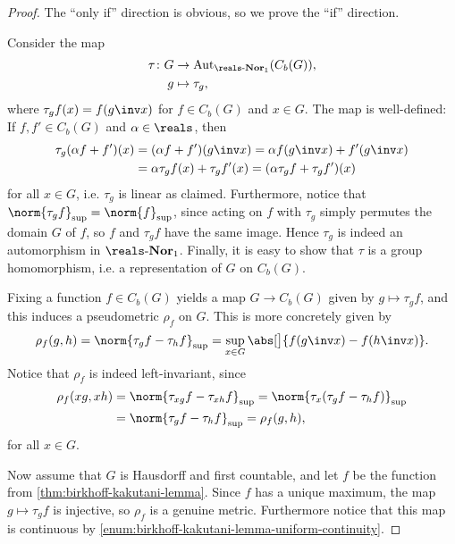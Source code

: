 \documentclass[article, a4paper, 11pt, oneside]{memoir}
\numberwithin{equation}{chapter}
\begin{document}
\begin{proof}
    The \enquote{only if} direction is obvious, so we prove the \enquote{if} direction.

    Consider the map
    \begin{align*}
        \tau \colon G &\to \mathrm{Aut}_{\catNor{\reals}_1}(C_b(G)), \\
        g &\mapsto \tau_g,
    \end{align*}
    where $\tau_g f(x) = f(g\inv x)$ for $f \in C_b(G)$ and $x \in G$. The map is well-defined: If $f,f' \in C_b(G)$ and $\alpha \in \reals$, then
    \begin{align*}
        \tau_g(\alpha f + f')(x)
            &= (\alpha f + f')(g\inv x)
             = \alpha f(g\inv x) + f'(g\inv x) \\
            &= \alpha \tau_g f(x) + \tau_g f'(x)
             = (\alpha \tau_g f + \tau_g f')(x)
    \end{align*}
    for all $x \in G$, i.e. $\tau_g$ is linear as claimed. Furthermore, notice that $\norm{\tau_g f}_{\sup} = \norm{f}_{\sup}$, since acting on $f$ with $\tau_g$ simply permutes the domain $G$ of $f$, so $f$ and $\tau_g f$ have the same image. Hence $\tau_g$ is indeed an automorphism in $\reals\text{-}\mathbf{Nor}_1$. Finally, it is easy to show that $\tau$ is a group homomorphism, i.e. a representation of $G$ on $C_b(G)$.
    
    Fixing a function $f \in C_b(G)$ yields a map $G \to C_b(G)$ given by $g \mapsto \tau_g f$, and this induces a pseudometric $\rho_f$ on $G$. This is more concretely given by
    \begin{equation*}
        \rho_f(g,h)
            = \norm{\tau_g f - \tau_h f}_{\sup}
            = \sup_{x \in G} \abs[\big]{f(g\inv x) - f(h\inv x)}.
    \end{equation*}
    Notice that $\rho_f$ is indeed left-invariant, since
    \begin{align*}
        \rho_f(xg,xh)
            &= \norm{\tau_{xg} f - \tau_{xh} f}_{\sup}
             = \norm{\tau_x(\tau_g f - \tau_h f)}_{\sup} \\
            &= \norm{\tau_g f - \tau_h f}_{\sup}
             = \rho_f(g,h),
    \end{align*}
    for all $x \in G$.

    Now assume that $G$ is Hausdorff and first countable, and let $f$ be the function from \cref{thm:birkhoff-kakutani-lemma}. Since $f$ has a unique maximum, the map $g \mapsto \tau_g f$ is injective, so $\rho_f$ is a genuine metric. Furthermore notice that this map is continuous by \cref{enum:birkhoff-kakutani-lemma-uniform-continuity}.
    

\end{proof}
\end{document}
